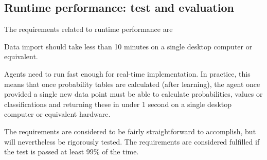

\subsection{Runtime performance: test and evaluation}

The requirements related to runtime performance are
\bde
\item[VER.U1.O1:] Data import should take less than 10 minutes  on a single desktop computer or equivalent.
\item[VER.U5.D4:] Agents need to run fast enough for real-time implementation. In practice, this means that once probability tables are calculated  (after learning), the agent once provided a single new data point must be able to calculate probabilities, values or classifications and returning these in under 1 second on a single desktop computer or equivalent hardware.
\ede

The requirements are considered to be fairly straightforward to accomplish, but  will nevertheless be rigorously tested. 
The  requirements are considered fulfilled if the test is passed at least $99\%$ of the time.


%
%
%










